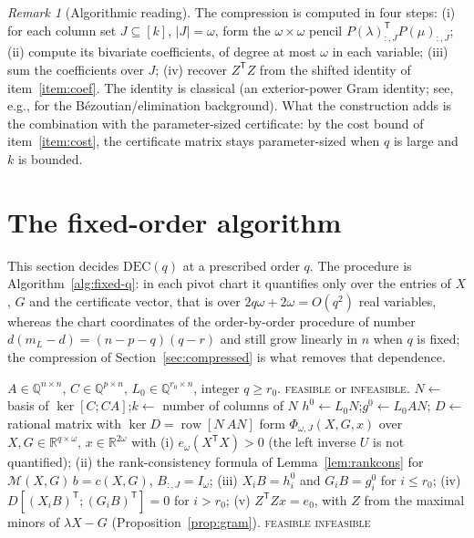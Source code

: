 \documentclass[journal]{IEEEtran}
\theoremstyle{plainn}
\theoremstyle{remark}
\newtheorem{remark}{Remark}
\begin{document}
\begin{remark}[Algorithmic reading]\label{rem:algo}
	The compression is computed in four steps:
	(i) for each column set $J\subseteq[k]$, $|J|=\omega$, form the
	$\omega\times\omega$ pencil $P(\lambda)_{:,J}^{\mathsf T}P(\mu)_{:,J}$;
	(ii) compute its bivariate coefficients, of degree at most $\omega$ in
	each variable;
	(iii) sum the coefficients over $J$;
	(iv) recover $Z^{\mathsf T}Z$ from the shifted identity of
	item~\ref{item:coef}.
	The identity is classical (an exterior-power Gram identity; see, e.g.,
	\cite{emi99} for the B\'ezoutian/elimination background). What the
	construction adds is the combination with the parameter-sized
	certificate: by the cost bound of item~\ref{item:cost}, the certificate
	matrix stays parameter-sized when $q$ is large and $k$ is bounded.
\end{remark}

\section{The fixed-order algorithm}\label{sec:fixedq}

This section decides $\mathrm{DEC}(q)$ at a prescribed order $q$. The procedure
is Algorithm~\ref{alg:fixed-q}: in each pivot chart it quantifies only over the
entries of $X$, $G$ and the certificate vector, that is over
$2q\omega+2\omega=O(q^2)$ real variables, whereas the chart coordinates of the
order-by-order procedure of \cite{fer26b} number $d(m_L-d)=(n-p-q)(q-r)$ and
still grow linearly in $n$ when $q$ is fixed; the compression of
Section~\ref{sec:compressed} is what removes that dependence.

\begin{algorithm}[!t]
\caption{Deciding $\mathrm{DEC}(q)$ for a fixed order $q$}
\label{alg:fixed-q}
\begin{algorithmic}[1]
\Require $A\in\mathbb Q^{n\times n}$, $C\in\mathbb Q^{p\times n}$,
$L_0\in\mathbb Q^{r_0\times n}$, integer $q\ge r_0$.
\Ensure \textsc{feasible} or \textsc{infeasible}.
\State $N\gets$ basis of $\ker[C;CA]$;\quad $k\gets$ number of columns of $N$
\State $h^0\gets L_0N$;\quad $g^0\gets L_0AN$;\quad
$D\gets$ rational matrix with $\ker D=\operatorname{row}[N\ AN]$
    \State form $\Phi_{\omega,J}(X,G,x)$ over $X,G\in\mathbb R^{q\times\omega}$,
           $x\in\mathbb R^{2\omega}$ with
    \Statex \quad (i) $e_\omega(X^{\mathsf T}X)>0$ (the left inverse $U$ is
           not quantified);
    \Statex \quad (ii) the rank-consistency formula of
           Lemma~\ref{lem:rankcons} for $\mathcal M(X,G)\,b=c(X,G)$, $B_{:,J}=I_\omega$;
    \Statex \quad (iii) $X_iB=h_i^0$ and $G_iB=g_i^0$ for $i\le r_0$;
    \Statex \quad (iv) $D[(X_iB)^{\mathsf T};(G_iB)^{\mathsf T}]=0$ for
           $i>r_0$;
    \Statex \quad (v) $Z^{\mathsf T}Zx=e_0$, with $Z$ from the maximal minors
           of $\lambda X-G$ (Proposition~\ref{prop:gram}).
      \State \Return \textsc{feasible}
    \EndIf
  \EndFor
\EndFor
\State \Return \textsc{infeasible}
\end{algorithmic}
\end{algorithm}
\end{document}
